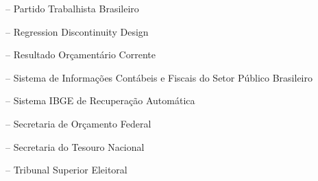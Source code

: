 {\begin{siglas}
  \item[PTB] -- Partido Trabalhista Brasileiro
  \item[RDD] -- Regression Discontinuity Design
  \item[ROC] -- Resultado Orçamentário Corrente
  \item[Siconfi] -- Sistema de Informações Contábeis e Fiscais do Setor Público Brasileiro
  \item[SIDRA] -- Sistema IBGE de Recuperação Automática
  \item[SOF] -- Secretaria de Orçamento Federal
  \item[STN] -- Secretaria do Tesouro Nacional
  \item[TSE] -- Tribunal Superior Eleitoral
\end{siglas}
}{}

 

 
 
